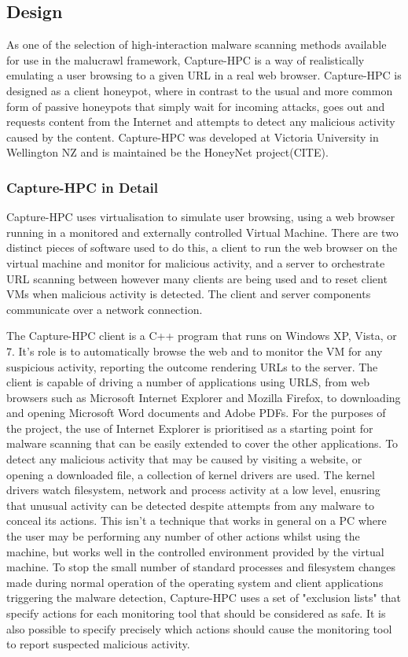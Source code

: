\subsection{Design}

As one of the selection of high-interaction malware scanning
methods available for use in the malucrawl framework,
Capture-HPC\cite{capture-hpc} is a way of
realistically emulating a user browsing to a given URL in a real web browser.
Capture-HPC is designed as a client honeypot, where in contrast to the usual and
more common form of passive honeypots that simply wait for incoming attacks,
goes out and requests content from the Internet and attempts to detect any
malicious activity caused by the content. Capture-HPC was developed at Victoria
University in Wellington NZ and is maintained be the HoneyNet project(CITE).

\subsubsection{Capture-HPC in Detail}

Capture-HPC uses virtualisation to simulate user browsing, using a web browser
running in a monitored and externally controlled Virtual Machine. There are two
distinct pieces of software used to do this, a client to run the web browser on
the virtual machine and monitor for malicious activity, and a server to
orchestrate URL scanning between however many clients are being used and to
reset client VMs when malicious activity is detected. The client and server
components communicate over a network connection.

The Capture-HPC client is a C++ program that runs on Windows XP, Vista, or 7.
It's role is to automatically browse the web and to monitor the VM for any
suspicious activity, reporting the outcome rendering URLs to the server. The
client is capable of driving a number of applications using URLS, from web
browsers such as Microsoft Internet Explorer and Mozilla Firefox, to downloading and opening
Microsoft Word documents and Adobe PDFs. For the purposes of the project, the
use of Internet Explorer is prioritised as a starting point for malware scanning
that can be easily extended to cover the other applications. To detect any
malicious activity that may be caused by visiting a website, or opening a
downloaded file, a collection of kernel drivers are used. The kernel drivers
watch filesystem, network and process activity at a low level, enusring that
unusual activity can be detected despite attempts from any malware to conceal
its actions. This isn't a technique that works in general on a PC where the user
may be performing any number of other actions whilst using the machine, but
works well in the controlled environment provided by the virtual machine. To
stop the small number of standard processes and filesystem changes made during
normal operation of the operating system and client applications triggering the
malware detection, Capture-HPC uses a set of "exclusion lists" that specify
actions for each monitoring tool that should be considered as safe. It is also
possible to specify precisely which actions should cause the monitoring tool to
report suspected malicious activity.


